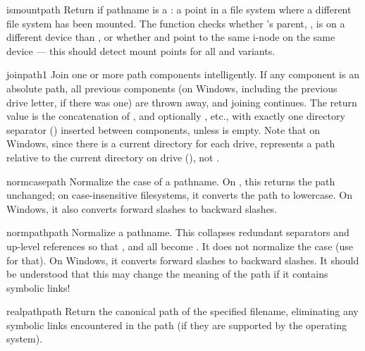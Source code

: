 \begin{funcdesc}{ismount}{path}
Return  if pathname  is a : a point in
a file system where a different file system has been mounted.  The
function checks whether 's parent, , is
on a different device than , or whether 
and  point to the same i-node on the same device --- this
should detect mount points for all \UNIX{} and \POSIX{} variants.
\end{funcdesc}

\begin{funcdesc}{join}{path1}
Join one or more path components intelligently.  If any component is
an absolute path, all previous components (on Windows, including the
previous drive letter, if there was one) are thrown away, and joining
continues.  The return value is the concatenation of , and
optionally , etc., with exactly one directory separator
() inserted between components, unless  is
empty.  Note that on Windows, since there is a current directory for
each drive,  represents a path
relative to the current directory on drive  (), not
.
\end{funcdesc}

\begin{funcdesc}{normcase}{path}
Normalize the case of a pathname.  On \UNIX, this returns the path
unchanged; on case-insensitive filesystems, it converts the path to
lowercase.  On Windows, it also converts forward slashes to backward
slashes.
\end{funcdesc}

\begin{funcdesc}{normpath}{path}
Normalize a pathname.  This collapses redundant separators and
up-level references so that ,  and
 all become .  It does not normalize the
case (use  for that).  On Windows, it converts
forward slashes to backward slashes. It should be understood that this may
change the meaning of the path if it contains symbolic links! 
\end{funcdesc}

\begin{funcdesc}{realpath}{path}
Return the canonical path of the specified filename, eliminating any
symbolic links encountered in the path (if they are supported by the
operating system).
\end{funcdesc}


